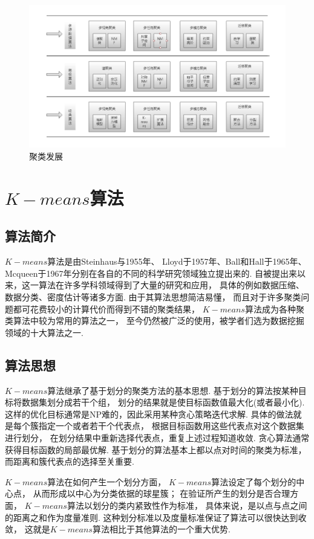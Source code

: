 \documentclass[bachelor,adobefonts]{jnuthesis}
\begin{document}
\begin{figure}[h!]
  \centering
    \includegraphics[width=1.0\linewidth]{Wjuleifazhan.png}
  \caption{聚类发展}
\end{figure}


\section{$K-means$算法}
\subsection{算法简介}
$K-means$算法是由Steinhaus与1955年、
Lloyd于1957年、Ball和Hall于1965年、
Mcqueen于1967年分别在各自的不同的科学研究领域独立提出来的.
自被提出来以来，这一算法在许多学科领域得到了大量的研究和应用，
具体的例如数据压缩、数据分类、密度估计等诸多方面.
由于其算法思想简洁易懂，
而且对于许多聚类问题都可花费较小的计算代价而得到不错的聚类结果，
$K-means$算法成为各种聚类算法中较为常用的算法之一，
至今仍然被广泛的使用，被学者们选为数据挖掘领域的十大算法之一.

\subsection{算法思想}
$K-means$算法继承了基于划分的聚类方法的基本思想.
基于划分的算法按某种目标将数据集划分成若干个组，
划分的结果就是使目标函数值最大化(或者最小化).
这样的优化目标通常是NP难的，因此采用某种贪心策略迭代求解.
具体的做法就是每个簇指定一个或者若干个代表点，
根据目标函数用这些代表点对这个数据集进行划分，
在划分结果中重新选择代表点，重复上述过程知道收敛.
贪心算法通常获得目标函数的局部最优解.
基于划分的算法基本上都以点对时间的聚类为标准，
而距离和簇代表点的选择至关重要.

$K-means$算法在如何产生一个划分方面，
$K-means$算法设定了每个划分的中心点，
从而形成以中心为分类依据的球星簇；
在验证所产生的划分是否合理方面，
$K-means$算法以划分的类内紧致性作为标准，
具体来说，是以点与点之间的距离之和作为度量准则.
这种划分标准以及度量标准保证了算法可以很快达到收敛，
这就是$K-means$算法相比于其他算法的一个重大优势.
\end{document}
